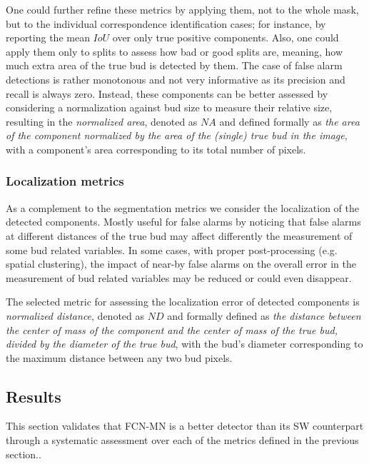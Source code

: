 \documentclass[a4paper,authoryear,review]{elsarticle}
\begin{document}
One could further refine these metrics by applying them, not to the whole mask, but to the individual correspondence identification cases; for instance, by reporting the mean $IoU$ over only true positive components. Also, one could apply them only to splits to assess how bad or good splits are, meaning, how much extra area of the true bud is detected by them. The case of false alarm detections is rather monotonous and not very informative as its precision and recall is always zero. Instead, these components can be better assessed by considering a normalization against bud size to measure their relative size, resulting in the \emph{normalized area}, denoted as $NA$ and defined formally as \emph{the area of the component normalized by the area of the (single) true bud in the image}, with a component’s area corresponding to its total number of pixels. 



\subsubsection{Localization metrics}
\label{subsec:locmetrics}

As a complement to the segmentation metrics we consider the localization of the detected components. Mostly useful for false alarms by noticing that false alarms at different distances of the true bud may affect differently the measurement of some bud related variables. In some cases, with proper post-processing (e.g. spatial clustering), the impact of near-by false alarms on the overall error in the measurement of bud related variables may be reduced or could even disappear. 

The selected metric for assessing the localization error of detected components is \emph{normalized distance}, denoted as $ND$ and formally defined as \emph{the distance between the center of mass of the component and the center of mass of the true bud, divided by the diameter of the true bud}, with the bud’s diameter corresponding to the maximum distance between any two bud pixels.

\subsection{Results}
\label{sec:resultados}

This section validates that FCN-MN is a better detector than its SW counterpart through a systematic assessment over each of the metrics defined in the previous section.. 
\end{document}
